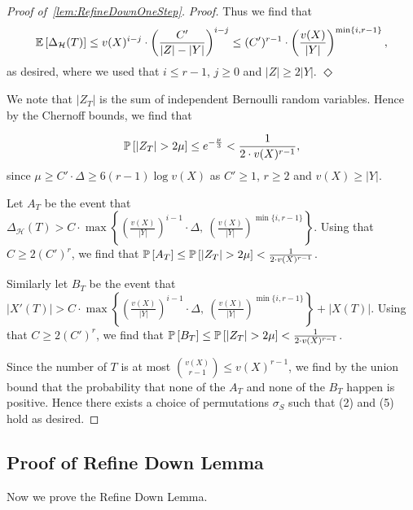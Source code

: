 \documentclass[11pt]{article}
\newcounter{i}
\theoremstyle{plain}
\newenvironment{proofclaim}[1][]%
{\noindent \emph{Proof.} {}{#1}{}}{\hfill
	$\Diamond$\vspace{1em}}
\renewcommand{\theclaim}{\thetheorem.\arabic{claim}}
\newenvironment{lateproof}[1]
 {%
  \renewcommand{\theclaim}{\ref{#1}.\arabic{claim}}%
  \begin{proof}[Proof of~\cref{#1}]%
 }
 {\end{proof}}
\theoremstyle{plain} %
\theoremstyle{definition}
\newcommand{\Prob}[1]{\ensuremath{%
\mathbb P\left[#1\right]
}}
\newcommand{\Expect}[1]{\ensuremath{%
\mathbb E\left[#1\right]
}}
\begin{document}
\begin{lateproof}{lem:RefineDownOneStep}
\begin{proofclaim}
Thus we find that
$$\Expect{\Delta_{\mathcal{H}}(T)} \le v(X)^{i-j} \cdot \left(\frac{C'}{|Z|-|Y|}\right)^{i-j} \le (C')^{r-1} \cdot \left(\frac{v(X)}{|Y|}\right)^{\min\{i,r-1\}},$$
as desired, where we used that $i\le r-1$, $j\ge 0$ and $|Z|\ge 2 |Y|$.
\end{proofclaim}


We note that $|Z_T|$ is the sum of independent Bernoulli random variables. Hence by the Chernoff bounds, we find that


$$\Prob{|Z_T| > 2\mu} \le e^{-\frac{\mu}{3}} < \frac{1}{2\cdot v(X)^{r-1}},$$
since $\mu \ge C'\cdot \Delta \ge 6(r-1)\log v(X)$ as $C'\ge 1$, $r\ge 2$ and $v(X)\ge |Y|$.

Let $A_T$ be the event that $\Delta_{\mathcal{H}}(T) > C \cdot \max\left\{\left(\frac{v(X)}{|Y|}\right)^{i-1} \cdot \Delta,~\left(\frac{v(X)}{|Y|}\right)^{\min\{i,r-1\}}\right\}$. 
Using that $C\ge 2(C')^{r}$, %
we find that $\Prob{A_T} \le \Prob{|Z_T|>2\mu} < \frac{1}{2\cdot v(X)^{r-1}}$. 

Similarly let $B_T$ be the event that $|X'(T)| > C \cdot \max\left\{\left(\frac{v(X)}{|Y|}\right)^{i-1} \cdot \Delta,~\left(\frac{v(X)}{|Y|}\right)^{\min\{i,r-1\}}\right\}+|X(T)|$. 
Using that $C\ge 2(C')^{r}$, %
we find that $\Prob{B_T} \le \Prob{|Z_T|>2\mu} < \frac{1}{2\cdot v(X)^{r-1}}$. 

Since the number of $T$ is at most $\binom{v(X)}{r-1} \le v(X)^{r-1}$, we find by the union bound that the probability that none of the $A_T$ and none of the $B_T$ happen is positive. Hence there exists a choice of permutations $\sigma_S$ such that (2) and (5) hold as desired.
\end{lateproof}

\subsection{Proof of Refine Down Lemma}

Now we prove the Refine Down Lemma.
\end{document}
